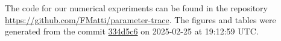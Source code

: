 The code for our numerical experiments can be found in the repository \url{https://github.com/FMatti/parameter-trace}. The figures and tables were generated from the commit \href{https://github.com/FMatti/parameter-trace/tree/334d5c6}{334d5c6} on 2025-02-25 at 19:12:59 UTC.
